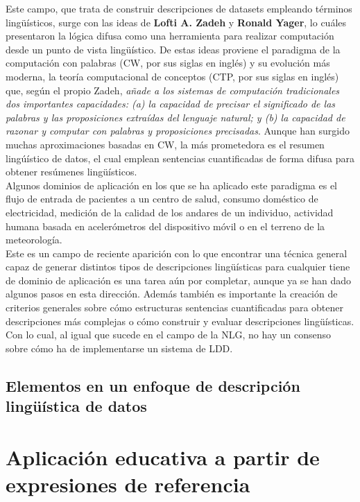 \documentclass[10pt,a4paper]{article}
\begin{document}
Este campo, que trata de construir descripciones de datasets empleando términos lingüísticos, surge con las ideas de \textbf{Lofti A. Zadeh} y \textbf{Ronald Yager}, lo cuáles presentaron la lógica difusa como una herramienta para realizar computación desde un punto de vista lingüístico. De estas ideas proviene el paradigma de la computación con palabras (CW, por sus siglas en inglés) y su evolución más moderna, la teoría computacional de conceptos (CTP, por sus siglas en inglés) que, según el propio Zadeh, \textit{añade a los sistemas de computación tradicionales dos importantes capacidades: (a) la capacidad de precisar el significado de las palabras y las proposiciones extraídas del lenguaje natural; y (b) la capacidad de razonar y computar con palabras y proposiciones precisadas}. Aunque han surgido muchas aproximaciones basadas en CW, la más prometedora es el resumen lingúístico de datos, el cual emplean sentencias cuantificadas de forma difusa para obtener resúmenes lingüísticos.\\

Algunos dominios de aplicación en los que se ha aplicado este paradigma es el flujo de entrada de pacientes a un centro de salud, consumo doméstico de electricidad, medición de la calidad de los andares de un individuo, actividad humana basada en acelerómetros del dispositivo móvil o en el terreno de la meteorología.\\

Este es un campo de reciente aparición con lo que encontrar una técnica general capaz de generar distintos tipos de descripciones lingüísticas para cualquier tiene de dominio de aplicación es una tarea aún por completar, aunque ya se han dado algunos pasos en esta dirección. Además también es importante la creación de criterios generales sobre cómo estructuras sentencias cuantificadas para obtener descripciones más complejas o cómo construir y evaluar descripciones lingüísticas. Con lo cual, al igual que sucede en el campo de la NLG, no hay un consenso sobre cómo ha de implementarse un sistema de LDD.

\subsection{Elementos en un enfoque de descripción lingüística de datos}


\section{Aplicación educativa a partir de expresiones de referencia}
\end{document}
